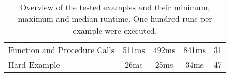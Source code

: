 \begin{table}
\begin{tabular}{lcccc}
	Function and Procedure Calls & 511ms                                                                        & 492ms                                                                          & 841ms                                                                         & 31                                                                                   \\
	Hard Example                 & 26ms                                                                         & 25ms                                                                           & 34ms                                                                          & 47                                                                                  
\end{tabular}
	\caption{Overview of the tested examples and their minimum, maximum and median runtime. One hundred runs per example were executed.}
	\label{tab:runtime-overview}
\end{table}



